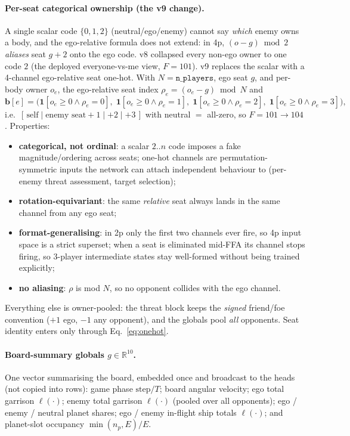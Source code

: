 \documentclass[11pt]{article}
\newcommand{\R}{\mathbb{R}}
\newcommand{\cd}[1]{\texttt{#1}}
\begin{document}
\paragraph{Per-seat categorical ownership (the v9 change).} A single scalar code
$\{0,1,2\}$ (neutral/ego/enemy) cannot say \emph{which} enemy owns a body, and the ego-relative
formula does not extend: in 4p, $(o-g)\bmod 2$ \emph{aliases} seat $g{+}2$ onto the ego code. v8
collapsed every non-ego owner to one code $2$ (the deployed everyone-vs-me view, $F{=}101$). v9
replaces the scalar with a 4-channel ego-relative seat one-hot. With $N=\cd{n\_players}$, ego seat
$g$, and per-body owner $o_e$, the ego-relative seat index $\rho_e=(o_e-g)\bmod N$ and
\begin{equation}
\mathbf b[e]=\Big(\mathbf 1[o_e{\ge}0\wedge\rho_e{=}0],\;
\mathbf 1[o_e{\ge}0\wedge\rho_e{=}1],\;
\mathbf 1[o_e{\ge}0\wedge\rho_e{=}2],\;
\mathbf 1[o_e{\ge}0\wedge\rho_e{=}3]\Big),
\label{eq:onehot}
\end{equation}
i.e.\ $[\,\text{self}\mid\text{enemy seat}{+}1\mid{+}2\mid{+}3\,]$ with neutral $=$ all-zero, so
$F=101\to104$. Properties:
\begin{itemize}[nosep,leftmargin=1.6em]
\item \textbf{categorical, not ordinal}: a scalar $2..n$ code imposes a fake magnitude/ordering across
  seats; one-hot channels are permutation-symmetric inputs the network can attach independent behaviour
  to (per-enemy threat assessment, target selection);
\item \textbf{rotation-equivariant}: the same \emph{relative} seat always lands in the same channel from
  any ego seat;
\item \textbf{format-generalising}: in 2p only the first two channels ever fire, so 4p input space is a
  strict superset; when a seat is eliminated mid-FFA its channel stops firing, so 3-player intermediate
  states stay well-formed without being trained explicitly;
\item \textbf{no aliasing}: $\rho$ is mod $N$, so no opponent collides with the ego channel.
\end{itemize}
Everything else is owner-pooled: the threat block keeps the \emph{signed} friend/foe convention ($+1$
ego, $-1$ any opponent), and the globals pool \emph{all} opponents. Seat identity enters only through
Eq.~\eqref{eq:onehot}.

\paragraph{Board-summary globals $g\in\R^{10}$.} One vector summarising the board, embedded once and
broadcast to the heads (not copied into rows): game phase $\mathrm{step}/T$; board angular velocity;
ego total garrison $\ell(\cdot)$; enemy total garrison $\ell(\cdot)$ (pooled over all opponents); ego /
enemy / neutral planet shares; ego / enemy in-flight ship totals $\ell(\cdot)$; and planet-slot
occupancy $\min(n_p,E)/E$.
\end{document}
